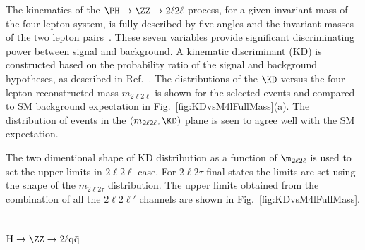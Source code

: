 The kinematics of the $\PH\to\ZZ \to 2\ell2\ell$ process,
for a given invariant mass of the four-lepton system,
is fully described by five angles and the invariant masses of the two lepton pairs~\cite{Cabibbo:1965zz,Gao:2010qx,DeRujula:2010ys}.
These seven variables provide
significant discriminating power between signal and background.
A kinematic discriminant (KD) is constructed based on the probability ratio of the signal and background hypotheses,
as described in Ref.~\cite{2l2qpaper}.
The distributions of the $\KD$ versus the four-lepton reconstructed mass $m_{2\ell 2\ell}$
is shown for the selected events and compared to SM background expectation 
in Fig.~\ref{fig:KDvsM4lFullMass}(a).
The distribution of events in the $(m_{2\ell 2\ell}, \KD)$ plane is seen to agree well with the 
SM expectation.



The two dimentional shape of KD distribution  as a function of $\m_{2\ell2\ell}$ is used to set the upper
limits in $2\ell2\ell$ case. For $2\ell2\tau$ final states the limits are set using the shape of the 
$m_{2\ell2\tau}$ distribution.
The upper limits obtained from the combination of all the $2\ell 2\ell'$ channels
are shown in Fig.~\ref{fig:KDvsM4lFullMass}.

\subsection{$\mathrm{H} \to \ZZ \to 2\ell \mathrm{q\bar{q}}$}

